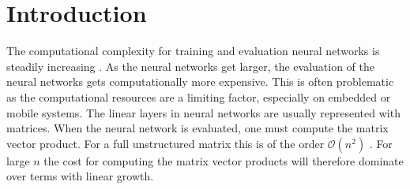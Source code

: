 \documentclass[doctype=mastersthesis,BCOR=15mm,biblatex]{ldvbook}%
\newcommand{\bigO}{\mathscr{O}}
\begin{document}
\tableofcontents








\chapter{Introduction} 

The computational complexity for training and evaluation neural networks is steadily increasing \cite{Schwartz_green_2020}.
As the neural networks get larger, the evaluation of the neural networks gets computationally more expensive. This is often problematic as the computational resources are a limiting factor, especially on embedded or mobile systems.
The linear layers in neural networks are usually represented with matrices.
When the neural network is evaluated, one must compute the matrix vector product.
For a full unstructured matrix this is of the order $\bigO(n^2)$ \cite{hackbusch_hierarchische_2009}.
For large $n$ the cost for computing the matrix vector products will therefore dominate over terms with linear growth.
\end{document}
